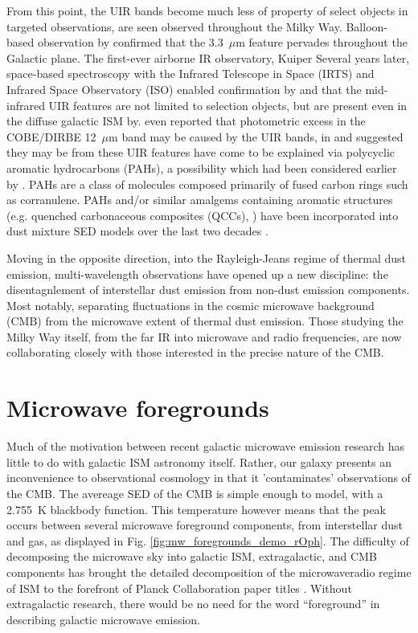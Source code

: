      From this point, the UIR bands become much less of property of select objects in targeted observations, are seen observed throughout the Milky Way. Balloon-based observation by \cite{giard94} confirmed that the 3.3~$\mu$m feature pervades throughout the Galactic plane. The first-ever airborne IR observatory, Kuiper Several years later, space-based spectroscopy with the Infrared Telescope in Space (IRTS)\citep{murakami96} and Infrared Space Observatory (ISO)\citep{kessler96} enabled confirmation by \cite{onaka96} and \cite{mattila96} that the mid-infrared UIR features are not limited to selection objects, but are present even in the diffuse galactic ISM by. \cite{dwek97} even reported that photometric excess in the COBE/DIRBE 12~$\mu$m band may be caused by the UIR bands, in and suggested they may be from these UIR features have come to be explained via polycyclic aromatic hydrocarbons (PAHs), a possibility which had been considered earlier by \cite{allamandola85,puget85}. PAHs are a class of molecules composed primarily of fused carbon rings such as corranulene. PAHs and/or similar amalgems containing aromatic structures (e.g. quenched carbonaceous composites (QCCs), \cite{sakata84}) have been incorporated into dust mixture SED models over the last two decades \citep{drli01, drli07, hony01, dustem11, galliano11, jones13, jones17}.

    Moving in the opposite direction, into the Rayleigh-Jeans regime of thermal dust emission, multi-wavelength observations have opened up a new discipline: the disentagnlement of interstellar dust emission from non-dust emission components. Most notably, separating fluctuations in the cosmic microwave background (CMB) from the microwave extent of thermal dust emission. Those studying the Milky Way itself, from the far IR into microwave and radio frequencies, are now collaborating closely with those interested in the precise nature of the CMB.

\section{Microwave foregrounds}

    Much of the motivation between recent galactic microwave emission research has little to do with galactic ISM astronomy itself. Rather, our galaxy presents an inconvenience to observational cosmology in that it 'contaminates' observations of the CMB. The avereage SED of the CMB is simple enough to model, with a 2.755~K blackbody function. This temperature however means that the peak occurs between several microwave foreground components, from interstellar dust and gas, as displayed in Fig. \ref{fig:mw_foregrounds_demo_rOph}. The difficulty of decomposing the microwave sky into galactic ISM, extragalactic, and CMB components has brought the detailed decomposition of the microwave\-radio regime of ISM to the forefront of Planck Collaboration paper titles \citep{planckEarly11I,planck2013I,planck2015I}. Without extragalactic research, there would be no need for the word ``foreground'' in describing galactic microwave emission.

